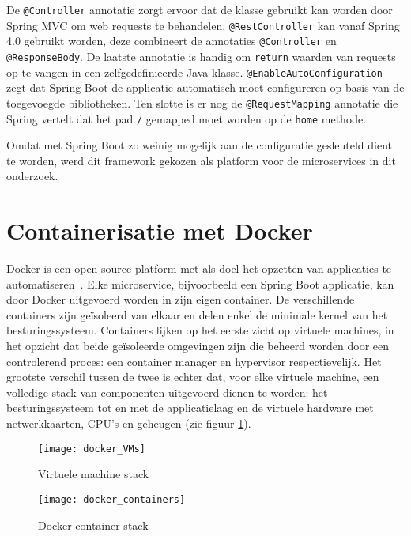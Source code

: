 De \texttt{@Controller} annotatie zorgt ervoor dat de klasse gebruikt kan worden door Spring MVC om web requests te behandelen. \texttt{@RestController} kan vanaf Spring 4.0 gebruikt worden, deze combineert de annotaties \texttt{@Controller} en \texttt{@ResponseBody}. De laatste annotatie is handig om \texttt{return} waarden van requests op te vangen in een zelfgedefinieerde Java klasse. \texttt{@EnableAutoConfiguration} zegt dat Spring Boot de applicatie automatisch moet configureren op basis van de toegevoegde bibliotheken. Ten slotte is er nog de \texttt{@RequestMapping} annotatie die Spring vertelt dat het pad \texttt{/} gemapped moet worden op de \texttt{home} methode.

Omdat met Spring Boot zo weinig mogelijk aan de configuratie gesleuteld dient te worden, werd dit framework gekozen als platform voor de microservices in dit onderzoek.

\section{Containerisatie met Docker}
\label{sec:docker}

Docker is een open-source platform met als doel het opzetten van applicaties te automatiseren~\autocite{Docker2016}. Elke microservice, bijvoorbeeld een Spring Boot applicatie, kan door Docker uitgevoerd worden in zijn eigen container. De verschillende containers zijn geïsoleerd van elkaar en delen enkel de minimale kernel van het besturingssysteem. Containers lijken op het eerste zicht op virtuele machines, in het opzicht dat beide geïsoleerde omgevingen zijn die beheerd worden door een controlerend proces: een container manager en hypervisor respectievelijk. Het grootste verschil tussen de twee is echter dat, voor elke virtuele machine, een volledige stack van componenten uitgevoerd dienen te worden: het besturingssysteem tot en met de applicatielaag en de virtuele hardware met netwerkkaarten, CPU's en geheugen (zie figuur \ref{fig:vm_stack}).

\begin{figure}
\caption{Virtuele machine stack}
\centering
\texttt{[image: docker\_VMs]}
\label{fig:vm_stack}
\end{figure}

\begin{figure}
\caption{Docker container stack}
\centering
\texttt{[image: docker\_containers]}
\label{fig:container_stack}
\end{figure}

